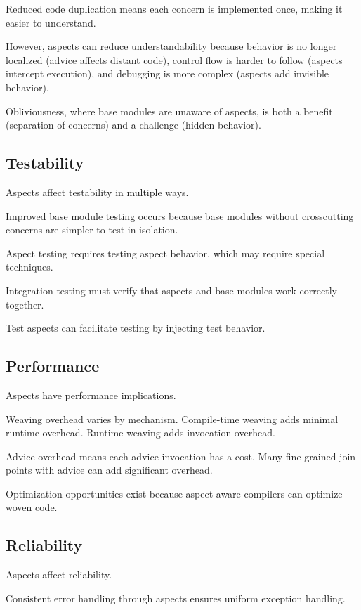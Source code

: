 \documentclass[11pt]{article}
\begin{document}
Reduced code duplication means each concern is implemented once, making it easier to understand.

However, aspects can reduce understandability because behavior is no longer localized (advice affects distant code), control flow is harder to follow (aspects intercept execution), and debugging is more complex (aspects add invisible behavior).

Obliviousness, where base modules are unaware of aspects, is both a benefit (separation of concerns) and a challenge (hidden behavior).

\subsection{Testability}

Aspects affect testability in multiple ways.

Improved base module testing occurs because base modules without crosscutting concerns are simpler to test in isolation.

Aspect testing requires testing aspect behavior, which may require special techniques.

Integration testing must verify that aspects and base modules work correctly together.

Test aspects can facilitate testing by injecting test behavior.

\subsection{Performance}

Aspects have performance implications.

Weaving overhead varies by mechanism. Compile-time weaving adds minimal runtime overhead. Runtime weaving adds invocation overhead.

Advice overhead means each advice invocation has a cost. Many fine-grained join points with advice can add significant overhead.

Optimization opportunities exist because aspect-aware compilers can optimize woven code.

\subsection{Reliability}

Aspects affect reliability.

Consistent error handling through aspects ensures uniform exception handling.
\end{document}
